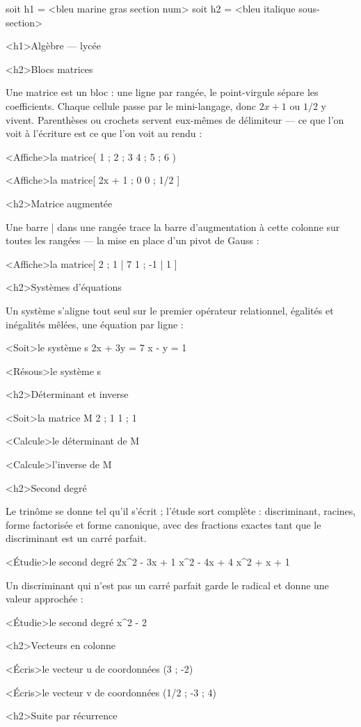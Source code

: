 \documentclass[marges=20, taille=11, precision=3]{texecole}
\begin{document}
soit h1 = <bleu marine gras section num>
soit h2 = <bleu italique sous-section>

<h1>Algèbre — lycée


<h2>Blocs matrices

Une matrice est un bloc : une ligne par rangée, le point-virgule sépare les coefficients. Chaque cellule passe par le mini-langage, donc $2x + 1$ ou $1/2$ y vivent. Parenthèses ou crochets servent eux-mêmes de délimiteur — ce que l'on voit à l'écriture est ce que l'on voit au rendu :

<Affiche>la matrice(
	1 ; 2 ; 3
	4 ; 5 ; 6
)

<Affiche>la matrice[
	2x + 1 ; 0
	0 ; 1/2
]

<h2>Matrice augmentée

Une barre | dans une rangée trace la barre d'augmentation à cette colonne sur toutes les rangées — la mise en place d'un pivot de Gauss :

<Affiche>la matrice[
	2 ; 1 | 7
	1 ; -1 | 1
]

<h2>Systèmes d'équations

Un système s'aligne tout seul sur le premier opérateur relationnel, égalités et inégalités mêlées, une équation par ligne :

<Soit>le système s {
	2x + 3y = 7
	x - y = 1
}

<Résous>le système s

<h2>Déterminant et inverse

<Soit>la matrice M {
	2 ; 1
	1 ; 1
}

<Calcule>le déterminant de M

<Calcule>l'inverse de M

<h2>Second degré

Le trinôme se donne tel qu'il s'écrit ; l'étude sort complète : discriminant, racines, forme factorisée et forme canonique, avec des fractions exactes tant que le discriminant est un carré parfait.

<Étudie>le second degré {
	2x^2 - 3x + 1
	x^2 - 4x + 4
	x^2 + x + 1
}

Un discriminant qui n'est pas un carré parfait garde le radical et donne une valeur approchée :

<Étudie>le second degré {
	x^2 - 2
}

<h2>Vecteurs en colonne

<Écris>le vecteur u de coordonnées (3 ; -2)

<Écris>le vecteur v de coordonnées (1/2 ; -3 ; 4)

<h2>Suite par récurrence
\end{document}
